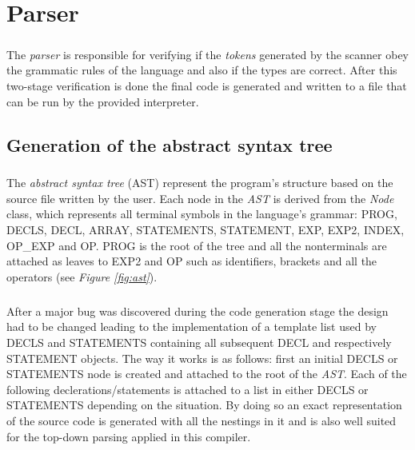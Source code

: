 \chapter{Parser}
\label{chapter:parser}
\paragraph{}
	The \textit{parser} is responsible for verifying if the \textit{tokens} generated by the scanner obey the grammatic rules of the language and also if the types are correct. After this two-stage verification is done the final code is generated and written to a file that can be run by the provided interpreter.
	
	\section{Generation of the abstract syntax tree}
	\paragraph{}
		The \textit{abstract syntax tree} (AST) represent the program's structure based on the source file written by the user. Each node in the \textit{AST} is derived from the \textit{Node} class, which represents all terminal symbols in the language's grammar: PROG, DECLS, DECL, ARRAY, STATEMENTS, STATEMENT, EXP, EXP2, INDEX, OP\_EXP and OP. PROG is the root of the tree and all the nonterminals are attached as leaves to EXP2 and OP such as identifiers, brackets and all the operators (see \textit{Figure \ref{fig:ast}}).
		
	\paragraph{}
		After a major bug was discovered during the code generation stage the design had to be changed leading to the implementation of a template list used by DECLS and STATEMENTS containing all subsequent DECL and respectively STATEMENT objects. The way it works is as follows: first an initial DECLS or STATEMENTS node is created and attached to the root of the \textit{AST}. Each of the following declerations/statements is attached to a list in either DECLS or STATEMENTS depending on the situation. By doing so an exact representation of the source code is generated with all the nestings in it and is also well suited for the top-down parsing applied in this compiler.
		
